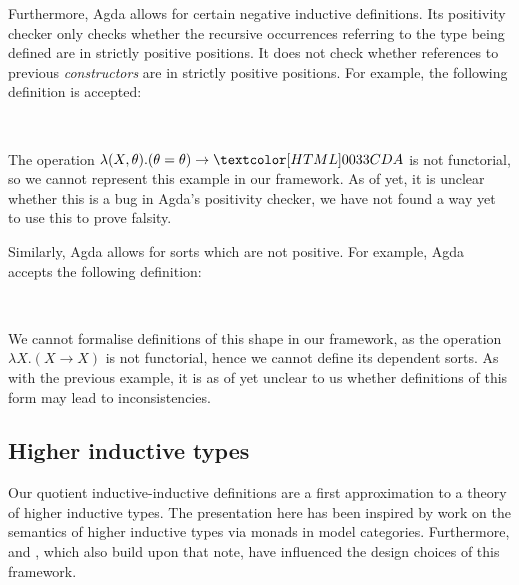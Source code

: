 Furthermore, Agda allows for certain negative inductive
definitions. Its positivity checker only checks whether the recursive
occurrences referring to the type being defined are in strictly
positive positions. It does not check whether references to previous
\emph{constructors} are in strictly positive positions. For example,
the following definition is accepted:
%
\begin{datatype}{\Aty}{\Set}
  \constr{\Aco}{\Aty} \\
  \constr{\Aci}{((\Aco = \Aco) \to \Aty) \to \Aty}
\end{datatype}
%
The operation $\lambda (X,\theta) . (\theta = \theta) \to \Aty$ is not
functorial, so we cannot represent this example in our framework. As
of yet, it is unclear whether this is a bug in Agda's positivity
checker, \ie we have not found a way yet to use this to prove falsity.

Similarly, Agda allows for sorts which are not positive. For example,
Agda accepts the following definition:
%
\begin{sorts}
    \sortnamety{\Aty}{\Set} \\
    \sortnamety{\Bty}{(\Aty \to \Aty) \to \Set}  
\end{sorts}
%
\begin{datatype}{\Aty}{}
  \constr{\Aco}{\Aty}
\end{datatype}
%
\begin{datatype}{\Bty}{}
\end{datatype}
%
We cannot formalise definitions of this shape in our framework, as the
operation $\lambda X . (X \to X)$ is not functorial, hence we cannot
define its dependent sorts. As with the previous example, it is as of
yet unclear to us whether definitions of this form may lead to
inconsistencies.

\subsection{Higher inductive types}

Our quotient inductive-inductive definitions are a first approximation
to a theory of higher inductive types. The presentation here has been
inspired by work on the semantics of higher inductive types
\cite{Lumsdaine2013} via monads in model categories. Furthermore,
\cite{Capriotti2014ii} and \cite{Altenkirch2015ii}, which also build
upon that note, have influenced the design choices of this framework.
